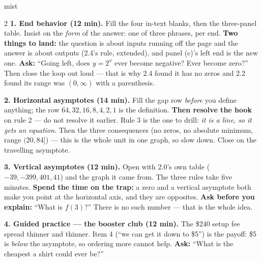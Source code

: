 \documentclass[10pt]{article}
\begin{document}
\boxguard
\begin{skillbox}[Lesson]{mist}
\begin{multicols}{2}
\textbf{1. End behavior (12 min).} Fill the four in-text blanks, then the three-panel table. Insist
on the \emph{form} of the answer: one of three phrases, per end. \textbf{Two things to land:} the
question is about inputs running off the page and the answer is about outputs (2.4's rule, extended),
and panel (c)'s left end is the new one. \textbf{Ask:} ``Going left, does $y=2^x$ ever become
negative? Ever become zero?'' Then close the loop out loud --- that is why 2.4 found it has no zeros
and 2.2 found its range was $(0,\infty)$ with a parenthesis.

\textbf{2. Horizontal asymptotes (14 min).} Fill the gap row \emph{before} you define anything; the
row $64, 32, 16, 8, 4, 2, 1$ is the definition. \textbf{Then resolve the hook} on rule 2 --- do not
resolve it earlier. Rule 3 is the one to drill: \emph{it is a line, so it gets an equation}. Then the
three consequences (no zeros, no absolute minimum, range $(20,84]$) --- this is the whole unit in one
graph, so slow down. Close on the travelling asymptote.

\textbf{3. Vertical asymptotes (12 min).} Open with 2.0's own table ($-39, -399, 401, 41$) and the
graph it came from. The three rules take five minutes. \textbf{Spend the time on the trap:} a zero
and a vertical asymptote both make you point at the horizontal axis, and they are opposites. \textbf{Ask
before you explain:} ``What is $f(3)$?'' There is no such number --- that is the whole idea.

\textbf{4. Guided practice --- the booster club (12 min).} The \$240 setup fee spread thinner and
thinner. Item 4 (``we can get it down to \$5'') is the payoff: \$5 is \emph{below} the asymptote, so
ordering more cannot help. \textbf{Ask:} ``What is the cheapest a shirt could ever be?''
\end{multicols}
\end{skillbox}
\end{document}

